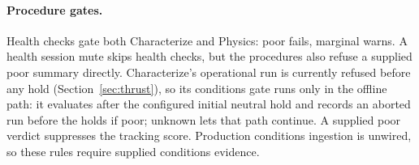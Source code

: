 \paragraph{Procedure gates.} Health checks gate both Characterize and Physics:
poor fails, marginal warns. A health session mute skips health checks, but the
procedures also refuse a supplied poor summary directly. Characterize's
operational run is currently refused before any hold (Section~\ref{sec:thrust}),
so its conditions gate runs only in the offline path: it evaluates after the
configured initial neutral hold and records an aborted run before the holds if
poor; unknown lets that path continue. A supplied poor verdict suppresses the
tracking score. Production conditions ingestion is unwired, so these rules
require supplied conditions evidence.

